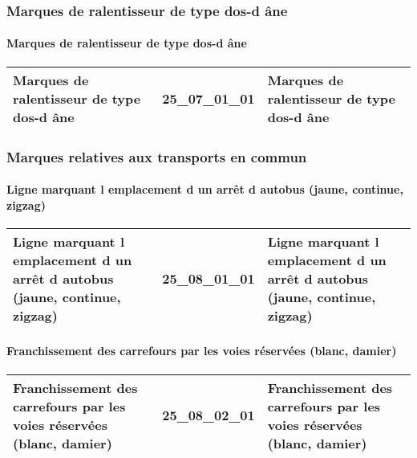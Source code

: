 \documentclass[12pt,titlepage,oneside]{book}
\begin{document}
\subsubsection{\large Marques de ralentisseur de type dos-d âne}
\paragraph{Marques de ralentisseur de type dos-d âne}
\noindent
\vspace{\baselineskip}

\renewcommand{\arraystretch}{1.2}
\begin{supertabular}{|p{10cm}|c|p{15cm}|}
 Marques de ralentisseur de type dos-d âne & 25\_07\_01\_01 & Marques de ralentisseur de type dos-d âne\\
\hline
\end{supertabular}

\subsubsection{\large Marques relatives aux transports en commun}
\paragraph{Ligne marquant l emplacement d un arrêt d autobus (jaune, continue, zigzag)}
\noindent
\vspace{\baselineskip}

\renewcommand{\arraystretch}{1.2}
\begin{supertabular}{|p{10cm}|c|p{15cm}|}
 Ligne marquant l emplacement d un arrêt d autobus (jaune, continue, zigzag) & 25\_08\_01\_01 & Ligne marquant l emplacement d un arrêt d autobus (jaune, continue, zigzag)\\
\hline
\end{supertabular}


\paragraph{Franchissement des carrefours par les voies réservées (blanc, damier)}
\noindent
\vspace{\baselineskip}

\renewcommand{\arraystretch}{1.2}
\begin{supertabular}{|p{10cm}|c|p{15cm}|}
 Franchissement des carrefours par les voies réservées (blanc, damier) & 25\_08\_02\_01 & Franchissement des carrefours par les voies réservées (blanc, damier)\\
\hline
\end{supertabular}
\end{document}
